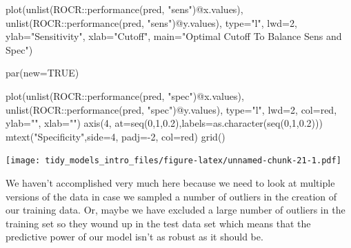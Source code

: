 \documentclass[
]{article}
\newenvironment{Shaded}{\begin{snugshade}}{\end{snugshade}}
\newcommand{\AttributeTok}[1]{\textcolor[rgb]{0.77,0.63,0.00}{#1}}
\newcommand{\ConstantTok}[1]{\textcolor[rgb]{0.00,0.00,0.00}{#1}}
\newcommand{\DecValTok}[1]{\textcolor[rgb]{0.00,0.00,0.81}{#1}}
\newcommand{\FloatTok}[1]{\textcolor[rgb]{0.00,0.00,0.81}{#1}}
\newcommand{\FunctionTok}[1]{\textcolor[rgb]{0.00,0.00,0.00}{#1}}
\newcommand{\NormalTok}[1]{#1}
\newcommand{\SpecialCharTok}[1]{\textcolor[rgb]{0.00,0.00,0.00}{#1}}
\newcommand{\StringTok}[1]{\textcolor[rgb]{0.31,0.60,0.02}{#1}}
\begin{document}
\begin{Shaded}
\begin{Highlighting}[]
\FunctionTok{plot}\NormalTok{(}\FunctionTok{unlist}\NormalTok{(ROCR}\SpecialCharTok{::}\FunctionTok{performance}\NormalTok{(pred, }\StringTok{"sens"}\NormalTok{)}\SpecialCharTok{@}\NormalTok{x.values), }
     \FunctionTok{unlist}\NormalTok{(ROCR}\SpecialCharTok{::}\FunctionTok{performance}\NormalTok{(pred, }\StringTok{"sens"}\NormalTok{)}\SpecialCharTok{@}\NormalTok{y.values), }
     \AttributeTok{type=}\StringTok{"l"}\NormalTok{, }\AttributeTok{lwd=}\DecValTok{2}\NormalTok{, }\AttributeTok{ylab=}\StringTok{"Sensitivity"}\NormalTok{, }\AttributeTok{xlab=}\StringTok{"Cutoff"}\NormalTok{,}
     \AttributeTok{main=}\StringTok{"Optimal Cutoff To Balance Sens and Spec"}\NormalTok{)}

\FunctionTok{par}\NormalTok{(}\AttributeTok{new=}\ConstantTok{TRUE}\NormalTok{)}

\FunctionTok{plot}\NormalTok{(}\FunctionTok{unlist}\NormalTok{(ROCR}\SpecialCharTok{::}\FunctionTok{performance}\NormalTok{(pred, }\StringTok{"spec"}\NormalTok{)}\SpecialCharTok{@}\NormalTok{x.values), }
     \FunctionTok{unlist}\NormalTok{(ROCR}\SpecialCharTok{::}\FunctionTok{performance}\NormalTok{(pred, }\StringTok{"spec"}\NormalTok{)}\SpecialCharTok{@}\NormalTok{y.values), }
     \AttributeTok{type=}\StringTok{"l"}\NormalTok{, }\AttributeTok{lwd=}\DecValTok{2}\NormalTok{, }\AttributeTok{col=}\StringTok{\textquotesingle{}red\textquotesingle{}}\NormalTok{, }\AttributeTok{ylab=}\StringTok{""}\NormalTok{, }\AttributeTok{xlab=}\StringTok{""}\NormalTok{)}
\FunctionTok{axis}\NormalTok{(}\DecValTok{4}\NormalTok{, }\AttributeTok{at=}\FunctionTok{seq}\NormalTok{(}\DecValTok{0}\NormalTok{,}\DecValTok{1}\NormalTok{,}\FloatTok{0.2}\NormalTok{),}\AttributeTok{labels=}\FunctionTok{as.character}\NormalTok{(}\FunctionTok{seq}\NormalTok{(}\DecValTok{0}\NormalTok{,}\DecValTok{1}\NormalTok{,}\FloatTok{0.2}\NormalTok{)))}
\FunctionTok{mtext}\NormalTok{(}\StringTok{"Specificity"}\NormalTok{,}\AttributeTok{side=}\DecValTok{4}\NormalTok{, }\AttributeTok{padj=}\SpecialCharTok{{-}}\DecValTok{2}\NormalTok{, }\AttributeTok{col=}\StringTok{\textquotesingle{}red\textquotesingle{}}\NormalTok{)}
\FunctionTok{grid}\NormalTok{()}
\end{Highlighting}
\end{Shaded}

\texttt{[image: tidy\_models\_intro\_files/figure-latex/unnamed-chunk-21-1.pdf]}

We haven't accomplished very much here because we need to look at
multiple versions of the data in case we sampled a number of outliers in
the creation of our training data. Or, maybe we have excluded a large
number of outliers in the training set so they wound up in the test data
set which means that the predictive power of our model isn't as robust
as it should be.
\end{document}
